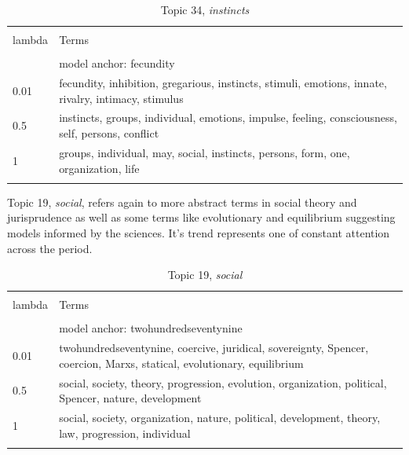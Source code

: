 \documentclass[]{book}
\theoremstyle{definition}
\theoremstyle{definition}
\theoremstyle{definition}
\theoremstyle{remark}
\begin{document}
\begin{table}[!htbp] \centering 
  \caption{Topic 34, \emph{instincts}} 
  \label{tab:t34-s} 
\begin{tabularx}{\textwidth}{@{\extracolsep{5pt}} lY} 
\\[-1.8ex]\hline 
\hline \\[-1.8ex] 
lambda & Terms \\ 
\hline \\[-1.8ex] 
 & model anchor: fecundity \\ 
0.01 & fecundity, inhibition, gregarious, instincts, stimuli, emotions, innate, rivalry, intimacy, stimulus \\ 
0.5 & instincts, groups, individual, emotions, impulse, feeling, consciousness, self, persons, conflict \\ 
1 & groups, individual, may, social, instincts, persons, form, one, organization, life \\ 
\hline \\[-1.8ex] 
\end{tabularx} 
\end{table}

Topic 19, \emph{social}, refers again to more abstract terms in social
theory and jurisprudence as well as some terms like evolutionary and
equilibrium suggesting models informed by the sciences. It's trend
represents one of constant attention across the period.



\begin{table}[!htbp] \centering 
  \caption{Topic 19, \emph{social}} 
  \label{tab:t19-s} 
\begin{tabularx}{\textwidth}{@{\extracolsep{5pt}} lY} 
\\[-1.8ex]\hline 
\hline \\[-1.8ex] 
lambda & Terms \\ 
\hline \\[-1.8ex] 
 & model anchor: twohundredseventynine \\ 
0.01 & twohundredseventynine, coercive, juridical, sovereignty, Spencer, coercion, Marxs, statical, evolutionary, equilibrium \\ 
0.5 & social, society, theory, progression, evolution, organization, political, Spencer, nature, development \\ 
1 & social, society, organization, nature, political, development, theory, law, progression, individual \\ 
\hline \\[-1.8ex] 
\end{tabularx} 
\end{table}
\end{document}
